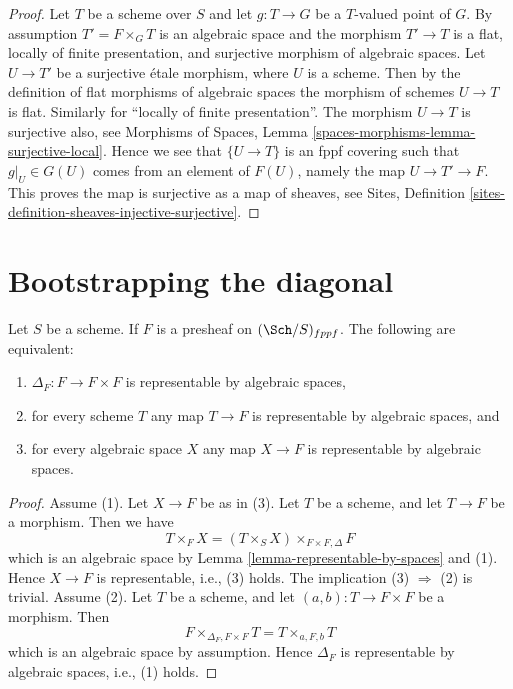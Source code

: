 \begin{proof}
Let $T$ be a scheme over $S$ and let $g : T \to G$ be a $T$-valued point of
$G$. By assumption $T' = F \times_G T$ is an algebraic space and
the morphism $T' \to T$ is a flat, locally of finite presentation, and
surjective morphism of algebraic spaces.
Let $U \to T'$ be a surjective \'etale morphism, where $U$ is a scheme.
Then by the definition of flat morphisms of algebraic spaces
the morphism of schemes $U \to T$ is flat. Similarly for
``locally of finite presentation''. The morphism $U \to T$ is surjective
also, see
Morphisms of Spaces, Lemma \ref{spaces-morphisms-lemma-surjective-local}.
Hence we see that $\{U \to T\}$ is an fppf covering such
that $g|_U \in G(U)$ comes from an element of $F(U)$, namely
the map $U \to T' \to F$. This proves the map is surjective as
a map of sheaves, see
Sites, Definition \ref{sites-definition-sheaves-injective-surjective}.
\end{proof}




\section{Bootstrapping the diagonal}
\label{section-bootstrap-diagonal}

\begin{lemma}
\label{lemma-representable-diagonal}
Let $S$ be a scheme.
If $F$ is a presheaf on $(\Sch/S)_{fppf}$.
The following are equivalent:
\begin{enumerate}
\item $\Delta_F : F \to F \times F$ is representable by algebraic spaces,
\item for every scheme $T$ any map $T \to F$ is representable by algebraic
spaces, and
\item for every algebraic space $X$ any map $X \to F$ is representable
by algebraic spaces.
\end{enumerate}
\end{lemma}

\begin{proof}
Assume (1). Let $X \to F$ be as in (3). Let $T$ be a scheme, and let
$T \to F$ be a morphism. Then we have
$$
T \times_F X = (T \times_S X) \times_{F \times F, \Delta} F
$$
which is an algebraic space by
Lemma \ref{lemma-representable-by-spaces}
and (1). Hence $X \to F$ is representable, i.e., (3) holds.
The implication (3) $\Rightarrow$ (2) is trivial. Assume (2).
Let $T$ be a scheme, and let $(a, b) : T \to F \times F$ be a morphism.
Then
$$
F \times_{\Delta_F, F \times F} T = T \times_{a, F, b} T
$$
which is an algebraic space by assumption. Hence $\Delta_F$ is
representable by algebraic spaces, i.e., (1) holds.
\end{proof}


